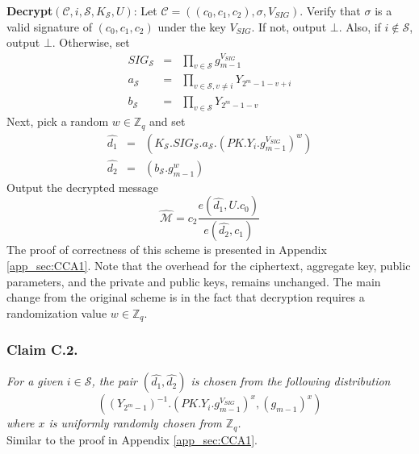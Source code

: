 \noindent \textbf{Decrypt}$(\mathcal{C},i,\mathcal{S},K_{\mathcal{S}},U)$: Let $\mathcal{C}=((c_0,c_1,c_2),\sigma,V_{SIG})$. Verify that $\sigma$ is a valid signature of $(c_0,c_1,c_2)$ under the key $V_{SIG}$. If not, output $\bot$. Also, if $i\notin\mathcal{S}$, output $\bot$. Otherwise, set 
\begin{eqnarray}
  SIG_{\mathcal{S}} &=& \prod_{v\in\mathcal{S}}g^{V_{SIG}}_{m-1}\nonumber\\
  a_{\mathcal{S}} &=& \prod_{v\in\mathcal{S},v\neq i}Y_{2^m-1-v+i}\nonumber\\
  b_{\mathcal{S}} &=& \prod_{v\in\mathcal{S}}Y_{2^m-1-v}\nonumber  
\end{eqnarray}
\noindent Next, pick a random $w\in \mathbb{Z}_q$ and set
 \begin{eqnarray}
  \hat{d_1} &=& (K_{\mathcal{S}}.SIG_{\mathcal{S}}.a_{\mathcal{S}}.(PK.Y_i.g^{V_{SIG}}_{m-1})^w)\nonumber\\
  \hat{d_2} &=& (b_{\mathcal{S}}.g^w_{m-1}) \nonumber
 \end{eqnarray}
 \noindent Output the decrypted message 
 \begin{equation}
  \hat{\mathcal{M}} = c_2\frac{{e}(\hat{d_1},U.c_0)}{{e}(\hat{d_2},c_1)}\nonumber
 \end{equation}
\noindent The proof of correctness of this scheme is presented in Appendix \ref{app_sec:CCA1}. Note that the overhead for the ciphertext, aggregate key, public parameters, and the private and public keys, remains unchanged. The main change from the original scheme is in the fact that decryption requires a randomization value $w\in\mathbb{Z}_q$.

\subsubsection{Claim C.2.} \textit{For a given $i\in\mathcal{S}$, the pair $(\hat{d_1},\hat{d_2})$ is chosen from the following distribution 
\begin{equation}
\left(\left({Y_{2^m-1}}\right)^{-1}.\left(PK.Y_i.g^{V_{SIG}}_{m-1}\right)^x,\left(g_{m-1}\right)^x\right)\nonumber
\end{equation}
\noindent where $x$ is uniformly randomly chosen from $\mathbb{Z}_q$.}\\
 Similar to the proof in Appendix \ref{app_sec:CCA1}.\\

